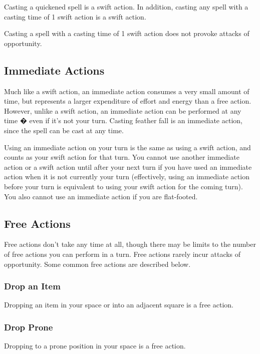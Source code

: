 Casting a quickened spell is a swift action. In addition, casting any spell with a casting time of 1 swift action is a swift action.

Casting a spell with a casting time of 1 swift action does not provoke attacks of opportunity.

\subsection{Immediate Actions}

Much like a swift action, an immediate action consumes a very small amount of time, but represents a larger expenditure of effort and energy than a free action. However, unlike a swift action, an immediate action can be performed at any time � even if it's not your turn. Casting feather fall is an immediate action, since the spell can be cast at any time.

Using an immediate action on your turn is the same as using a swift action, and counts as your swift action for that turn. You cannot use another immediate action or a swift action until after your next turn if you have used an immediate action when it is not currently your turn (effectively, using an immediate action before your turn is equivalent to using your swift action for the coming turn). You also cannot use an immediate action if you are flat-footed. 

\subsection{Free Actions}

Free actions don't take any time at all, though there may be limits to the number of free actions you can perform in a turn. Free actions rarely incur attacks of opportunity. Some common free actions are described below.

\subsubsection{Drop an Item}

Dropping an item in your space or into an adjacent square is a free action.

\subsubsection{Drop Prone}

Dropping to a prone position in your space is a free action.


